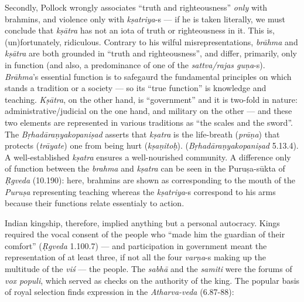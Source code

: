Secondly, Pollock wrongly associates “truth and righteousness” {\sl only} with brahmins, and violence only with {\sl kṣatriya}-s --- if he is taken literally, we must conclude that {\sl kṣātra} has not an iota of truth or righteousness in it. This is, (un)fortunately, ridiculous. Contrary to his wilful misrepresentations, {\sl brāhma} and {\sl kṣātra} are both grounded in “truth and righteousness”, and differ, primarily, only in function (and also, a predominance of one of the {\sl sattva/rajas guṇa}-s). {\sl Brāhma}’s essential function is to safegaurd the fundamental principles on which stands a tradition or a society --- so its “true function” is knowledge and teaching. {\sl Kṣātra}, on the other hand, is “government” and it is two-fold in nature: administrative/judicial on the one hand, and military on the other --- and these two elements are represented in various traditions as “the scales and the sword”. The {\sl Bṛhadāraṇyakopaniṣad} asserts that {\sl kṣatra} is the life-breath ({\sl prāṇa}) that protects ({\sl trāyate}) one from being hurt ({\sl kṣaṇitoḥ}). ({\sl Bṛhadāraṇyakopaniṣad} 5.13.4).  A well-established {\sl kṣatra} ensures a well-nourished community. A difference only of function between the {\sl brahma} and {\sl kṣatra} can be seen in the Puruṣa-sūkta of {\sl Ṛgveda} (10.190): here, brahmins are shown as corresponding to the mouth of the {\sl Puruṣa} representing teaching whereas the {\sl kṣatriya}-s correspond to his arms because their functions relate essentialy to action. 

Indian kingship, therefore, implied anything but a personal autocracy. Kings required the vocal consent of the people who “made him the guardian of their comfort” ({\sl Ṛgveda} 1.100.7) --- and participation in government meant the representation of at least three, if not all the four {\sl varṇa}-s making up the multitude of the {\sl viś} --- the people. The {\sl sabhā} and the {\sl samiti} were the forums of {\sl vox populi}, which served as checks on the authority of the king. The popular basis of royal selection finds expression in the {\sl Atharva-veda} (6.87-88):

